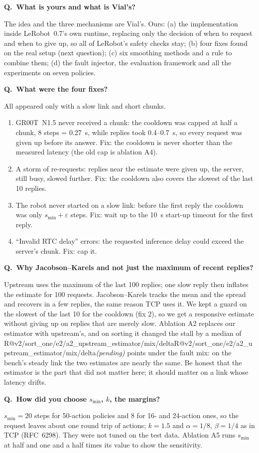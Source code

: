 \documentclass[11pt,a4paper]{article}
\makeatletter
\newcommand{\R}[1]{\ifcsname R@#1\endcsname\csname R@#1\endcsname\else\pending\fi}
\newcommand{\pending}{\textit{\color{warn}(pending)}}
\newcommand{\groot}{GR00T~N1.5}
\newcounter{qn}
\newcommand{\q}[2]{\stepcounter{qn}\par\medskip
  {\bfseries\color{accent}Q\theqn.\ #1}\par\nopagebreak[4]#2\par}
\makeatother
\begin{document}
\q{What is yours and what is Vial's?}{The idea and the three mechanisms are Vial's. Ours: (a) the implementation
inside LeRobot~0.7's own runtime, replacing only the decision of when to request and when to give up, so all of
LeRobot's safety checks stay; (b) four fixes found on the real setup (next question); (c) six smoothing methods and a
rule to combine them; (d) the fault injector, the evaluation framework and all the experiments on seven policies.}

\q{What were the four fixes?}{All appeared only with a slow link and short chunks.
\begin{enumerate}[nosep]
\item \groot{} never received a chunk: the cooldown was capped at half a chunk, 8 steps = 0.27~s, while replies took
  0.4--0.7~s, so every request was given up before its answer. Fix: the cooldown is never shorter than the measured
  latency (the old cap is ablation A4).
\item A storm of re-requests: replies near the estimate were given up, the server, still busy, slowed further. Fix:
  the cooldown also covers the slowest of the last 10 replies.
\item The robot never started on a slow link: before the first reply the cooldown was only $s_{\min}+\varepsilon$
  steps. Fix: wait up to the 10~s start-up timeout for the first reply.
\item \enquote{Invalid RTC delay} errors: the requested inference delay could exceed the server's chunk. Fix: cap it.
\end{enumerate}}

\q{Why Jacobson--Karels and not just the maximum of recent replies?}{Upstream uses the maximum of the last 100
replies; one slow reply then inflates the estimate for 100 requests. Jacobson--Karels tracks the mean and the spread
and recovers in a few replies, the same reason TCP uses it. We kept a guard on the slowest of the last 10 for the
cooldown (fix 2), so we get a responsive estimate without giving up on replies that are merely slow. Ablation A2
replaces our estimator with upstream's, and on sorting it changed the stall by a median of \R{v2/sort_one/e2/a2_upstream_estimator/mix/delta} points under the fault mix: on the bench's steady link the two estimates are nearly the same. Be honest that the estimator is the part that did not matter here; it should matter on a link whose latency drifts.}

\q{How did you choose $s_{\min}$, $k$, the margins?}{$s_{\min}=20$ steps for 50-action policies and 8 for 16- and
24-action ones, so the request leaves about one round trip of actions; $k=1.5$ and $\alpha=1/8$, $\beta=1/4$ as in
TCP (RFC~6298). They were not tuned on the test data. Ablation A5 runs $s_{\min}$ at half and one and a half times
its value to show the sensitivity.}
\end{document}
